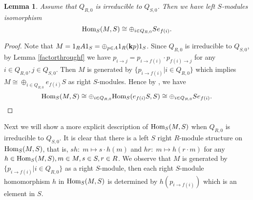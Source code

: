 \documentclass[a4paper, reqno]{amsart}
\newtheorem{lem}[thm]{Lemma}
\theoremstyle{definition}
\theoremstyle{remark}
\numberwithin{equation}{section}
\begin{document}
\begin{lem} \label{hom(MS)}
Assume that $Q_{R,0}$ is irreducible to $Q_{S,0}$. Then we have left $S$-modules isomorphism
$$\textup{Hom}_S(M,S)\cong \oplus_{i\in Q_{R,0}} Se_{f(i)}.$$
\end{lem}

\begin{proof}
Note that $M=1_RA1_S=\oplus_{p\in A}1_R({\bf k}p)1_S$. Since $Q_{R,0}$ is irreducible to $Q_{S,0}$, by Lemma \ref{factorthroughf} we have $p_{i\to j}=p_{i\to f(i)}\cdot p_{f(i)\to j}$ for any $i\in Q_{R,0},j\in Q_{S,0}$. Then $M$ is generated by $\{p_{i\to f(i)}|i\in Q_{R,0}\}$ which implies $M\cong\oplus_{i\in Q_{R,0}}e_{f(i)}S$ as right $S$-modules. Hence by {\color{blue}\cite[I.4.2]{yellowbook} }, we have $$\textup{Hom}_S(M,S)\cong \oplus_{i\in Q_{R,0}}\textup{Hom}_S(e_{f(i)}S,S)\cong\oplus_{i\in Q_{R,0}} Se_{f(i)}.$$
\end{proof}

Next we will show a more explicit description of $\textup{Hom}_S(M,S)$ when $Q_{R,0}$ is irreducible to $Q_{S,0}$. It is clear that there is a left $S$ right $R$-module structure on $\textup{Hom}_S(M,S)$, that is, $sh:\;m\mapsto s\cdot h(m)$ and $hr:\;m\mapsto h(r\cdot m)$ for any $h\in\textup{Hom}_S(M,S),m\in M,s\in S, r\in R$. We observe that $M$ is generated by $\{p_{i\to f(i)}|i\in Q_{R,0}\}$ as a right $S$-module, then each right $S$-module homomorphism $h$ in $\textup{Hom}_S(M,S)$ is determined by $h(p_{i\to f(i)})$ which is an element in $S$.
\end{document}
